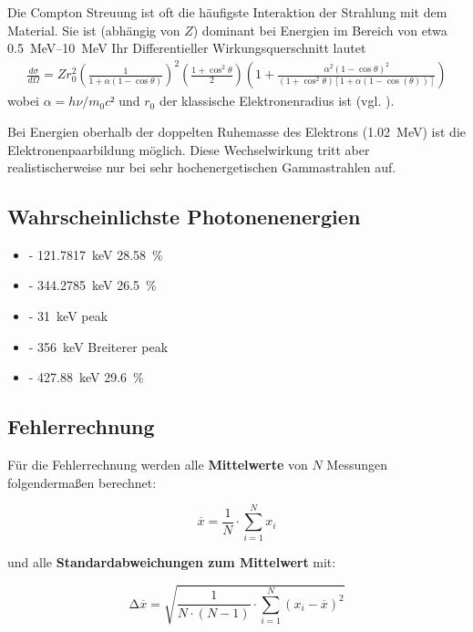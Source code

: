 Die Compton Streuung ist oft die häufigste Interaktion der Strahlung mit dem Material.
Sie ist (abhängig von $Z$) dominant bei Energien im Bereich von etwa \qtyrange{0.5}{10}{\MeV}
Ihr Differentieller Wirkungsquerschnitt lautet
\begin{align}
    \frac{d\sigma}{d \Omega} = Z r_0^2 \left(\frac{1}{1+\alpha(1-\cos\theta)}\right)^2 %
    \left(\frac{1+ \cos^2\theta}{2}\right)%
    \left(1+ \frac{\alpha^2(1-\cos \theta)^2}{(1+\cos^2 \theta)[1+\alpha(1-\cos(\theta))]}\right)
    \label{eq:wq_compton}
\end{align}
wobei $\alpha = h \nu / m_0 c²$ und $r_0$ der klassische Elektronenradius ist (vgl. \cite{book:knoll}).

Bei Energien oberhalb der doppelten Ruhemasse des Elektrons (\qty{1.02}{\MeV}) ist die Elektronenpaarbildung möglich.
Diese Wechselwirkung tritt aber realistischerweise nur bei sehr hochenergetischen Gammastrahlen auf.

\subsection{Wahrscheinlichste Photonenenergien}
\begin{itemize} 
    \item[\ce{^{152}Eu}] - \qty{121.7817} {\keV} \qty{28.58}{\%} 
    \item[\ce{^{152}Eu}] - \qty{344.2785} {\keV} \qty{26.5}{\%}
    \item[\ce{^{133}Ba}] - \qty{31}{\keV} peak
    \item[\ce{^{133}Ba}] - \qty{356}{\keV} Breiterer peak
    \item[\ce{^{125}Sb}] - \qty{427.88}{\keV} \qty{29.6}{\%}
\end{itemize}

\subsection{Fehlerrechnung}
Für die Fehlerrechnung werden alle \textbf{Mittelwerte} von $N$ Messungen folgendermaßen berechnet:

\begin{equation}
    \overline{x} = \frac{1}{N} \cdot \sum_{i=1}^N x_i
    \label{eqn:Mittelwert}
\end{equation}

und alle \textbf{Standardabweichungen zum Mittelwert} mit:

\begin{equation}
    \increment\overline{x} = \sqrt{\frac{1}{N\cdot(N-1)}\cdot\sum_{i=1}^N (x_i-\overline{x})^2}
    \label{eqn:St_Mittelwert}
\end{equation}

